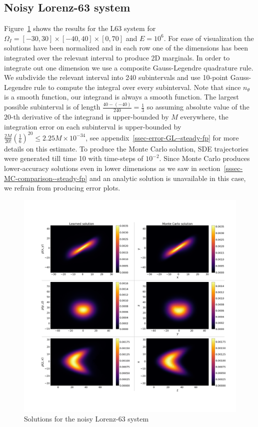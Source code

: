 \subsection{Noisy Lorenz-63 system} Figure~\ref{fig:L63-steady--steady-fp} shows the results for the L63 system for $\Omega_I = [-30, 30]\times[-40, 40]\times[0, 70]$ and $E=10^6$. For ease of visualization the solutions have been normalized and in each row one of the dimensions has been integrated over the relevant interval to produce 2D marginals. In order to integrate out one dimension we use a composite Gauss-Legendre quadrature rule. We subdivide the relevant interval into 240 subintervals and use 10-point Gauss-Legendre rule to compute the integral over every subinterval. Note that since $n_\theta$ is a smooth function, our integrand is always a smooth function. The largest possible subinterval is of length $\frac{40-(-40)}{240}=\frac{1}{3}$ so assuming absolute value of the $20$-th derivative of the integrand is upper-bounded by $M$ everywhere, the integration error on each subinterval is upper-bounded by $\frac{2M}{20!}\left(\frac{1}{6}\right)^{20}\le2.25M\times10^{-34}$, see appendix~\ref{ssec-error-GL--steady-fp} for more details on this estimate. To produce the Monte Carlo solution, SDE trajectories were generated till time 10 with time-steps of $10^{-2}$. 
Since Monte Carlo produces lower-accuracy solutions even in lower dimensions as we saw in section~\ref{sssec-MC-comparison--steady-fp} and an analytic solution is unavailable in this case, we refrain from producing error plots.

\begin{figure}[!ht]
    \centering\includegraphics[scale=0.21]{steady-fp/plots/L63-steady.png}  \caption{Solutions for the noisy Lorenz-63 system}
    \label{fig:L63-steady--steady-fp}
\end{figure}

